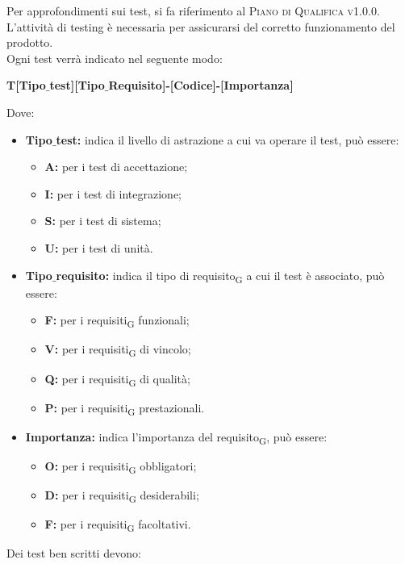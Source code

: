     Per approfondimenti sui test, si fa riferimento al \textsc{Piano di Qualifica v1.0.0}.
    L'attività di testing è necessaria per assicurarsi del corretto funzionamento del prodotto.\\Ogni test verrà indicato nel seguente modo:\\
    \begin{center}
    	\textbf{T[Tipo$\_$test][Tipo$\_$Requisito]-[Codice]-[Importanza]}
    \end{center}
    Dove:
    \begin{itemize}
    	\item \textbf{Tipo$\_$test:} indica il livello di astrazione a cui va operare il test, può essere:
    	\begin{itemize}
    		\item \textbf{A:} per i test di accettazione;
    		\item \textbf{I:} per i test di integrazione;
    		\item \textbf{S:} per i test di sistema;
    		\item \textbf{U:} per i test di unità.
    	\end{itemize}
    	\item \textbf{Tipo$\_$requisito:} indica il tipo di requisito\textsubscript{G} a cui il test è associato, può essere:
    	\begin{itemize}
    		\item \textbf{F:} per i requisiti\textsubscript{G} funzionali;
    		\item \textbf{V:} per i requisiti\textsubscript{G} di vincolo;
    		\item \textbf{Q:} per i requisiti\textsubscript{G} di qualità;
    		\item \textbf{P:} per i requisiti\textsubscript{G} prestazionali.
    	\end{itemize}
    	\item \textbf{Importanza:} indica l'importanza del requisito\textsubscript{G}, può essere:
    	\begin{itemize}
    		\item \textbf{O:} per i requisiti\textsubscript{G} obbligatori;
    		\item \textbf{D:} per i requisiti\textsubscript{G} desiderabili;
    		\item \textbf{F:} per i requisiti\textsubscript{G} facoltativi.
    	\end{itemize}
    \end{itemize}
    Dei test ben scritti devono:
